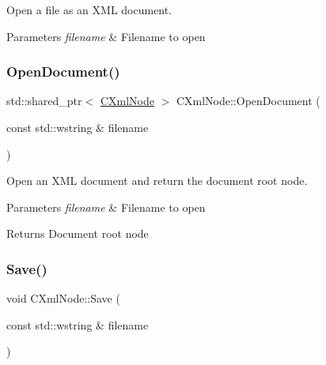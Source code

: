 Open a file as an X\+ML document. 


\begin{DoxyParams}{Parameters}
{\em filename} & Filename to open \\
\hline
\end{DoxyParams}
\mbox{\label{classxmlnode_1_1_c_xml_node_ad71ff87937ae943a9c11f5891d53d93b}} 
\subsubsection{\texorpdfstring{OpenDocument()}{OpenDocument()}}
{\footnotesize\ttfamily std\+::shared\+\_\+ptr$<$ \mbox{\hyperlink{classxmlnode_1_1_c_xml_node}{C\+Xml\+Node}} $>$ C\+Xml\+Node\+::\+Open\+Document (\begin{DoxyParamCaption}\item[{const std\+::wstring \&}]{filename }\end{DoxyParamCaption})\hspace{0.3cm}{\ttfamily [static]}}



Open an X\+ML document and return the document root node. 


\begin{DoxyParams}{Parameters}
{\em filename} & Filename to open \\
\hline
\end{DoxyParams}
\begin{DoxyReturn}{Returns}
Document root node 
\end{DoxyReturn}
\mbox{\label{classxmlnode_1_1_c_xml_node_a0f83eef381fe59726503e0fcb854661d}} 
\subsubsection{\texorpdfstring{Save()}{Save()}}
{\footnotesize\ttfamily void C\+Xml\+Node\+::\+Save (\begin{DoxyParamCaption}\item[{const std\+::wstring \&}]{filename }\end{DoxyParamCaption})}



